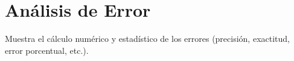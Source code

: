 \chapter{Análisis de Error}
Muestra el cálculo numérico y estadístico de los errores (precisión, exactitud, error porcentual, etc.).